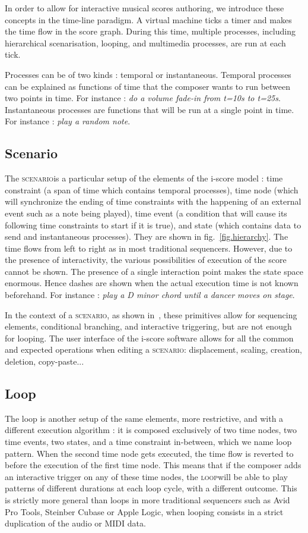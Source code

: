 \documentclass{article}
\newcommand{\scenario}{\textsc{scenario}}
\newcommand{\Loop}{\textsc{loop}}
\begin{document}
In order to allow for interactive musical scores authoring, we introduce these concepts in the time-line paradigm.
A virtual machine ticks a timer and makes the time flow in the score graph. 
During this time, multiple processes, including hierarchical scenarisation, looping, and multimedia processes, are 
run at each tick. 

Processes can be of two kinds : temporal or instantaneous.
Temporal processes can be explained as functions of time that the composer wants to run between 
two points in time. 
For instance : \emph{do a volume fade-in from t=10s to t=25s}.~\\
Instantaneous processes are functions that will be run at a single point in time.
For instance : \emph{play a random note}.

\subsection{Scenario}
The \scenario is a particular setup of the elements of the i-score model : time constraint (a span of time which contains temporal processes), time node (which will synchronize the ending of time constraints with the happening of an external event such as a note being played), time event (a condition that will cause its following time constraints to start if it is true), and state (which contains data to send and instantaneous processes).
They are shown in fig.~\ref{fig.hierarchy}. 
The time flows from left to right as in most traditional sequencers. 
However, due to the presence of interactivity, the various possibilities of execution of the score cannot be shown. 
The presence of a single interaction point makes the state space enormous.
Hence dashes are shown when the actual execution time is not known beforehand. 
For instance : \emph{play a D minor chord until a dancer moves on stage}.

In the context of a \scenario, as shown in~\cite{celerier2015ossia}, these primitives allow for sequencing elements, conditional branching, and interactive triggering, but are not enough for looping.
The user interface of the i-score software allows for all the common and expected operations when editing a \scenario : displacement, scaling, creation, deletion, copy-paste...

\subsection{Loop}
The loop is another setup of the same elements, more restrictive, and with a different execution algorithm : it is 
composed exclusively of two time nodes, two time events, two states, and a time constraint in-between, which we name loop pattern.
When the second time node gets executed, the time flow is reverted to before the execution of the first time node.
This means that if the composer adds an interactive trigger on any of these time nodes, the \Loop will be able to play patterns of different durations at each loop cycle, with a different outcome.
This is strictly more general than loops in more traditional sequencers such as Avid Pro Tools, Steinber Cubase or Apple Logic, when looping consists in a strict duplication of the audio or MIDI data.
\end{document}
